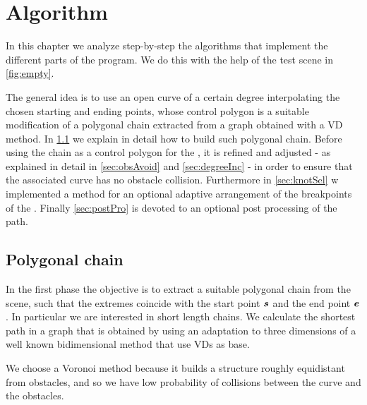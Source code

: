 \documentclass[dissertation.tex]{subfiles}
\begin{document}
\chapter{Algorithm}\label{cha:algorithm}
In this chapter we analyze step-by-step the algorithms that implement
the different parts of the program. We do this with the help of the
test scene in \cref{fig:empty}.

The general idea is to use an open \bs curve of a certain degree
interpolating the chosen starting and ending points, whose
control polygon is a suitable modification of a polygonal chain
extracted from a graph
obtained with a \ac{VD} method. In \cref{sec:polChain} we
explain in detail how to
build such polygonal chain. Before using the chain as a control
polygon for the \bs, it is refined and adjusted - as explained in
detail in \cref{sec:obsAvoid} and \cref{sec:degreeInc} - in order to
ensure that the associated \bs curve has no obstacle
collision. Furthermore in \cref{sec:knotSel} w implemented a method
for an optional adaptive 
arrangement of the breakpoints of the \bs. Finally \cref{sec:postPro}
is devoted to an optional post processing of the path.

\section{Polygonal chain}\label{sec:polChain}
In the first phase the objective is to extract a suitable polygonal chain from
the scene, such that the extremes coincide with the start point $\boldsymbol{s}$
and the end point $\boldsymbol{e}$. In particular we are interested in short length
chains. We calculate the shortest path
in a graph that is obtained by using an adaptation to three
dimensions of a well known bidimensional method
\cite{bhattacharya}\cite{ho-liu}\cite{seda-pich} that use
\acp{VD} as base.

We choose a Voronoi method because it builds a structure roughly
equidistant from obstacles, and so we have low probability of
collisions between the curve and the obstacles.
\end{document}

